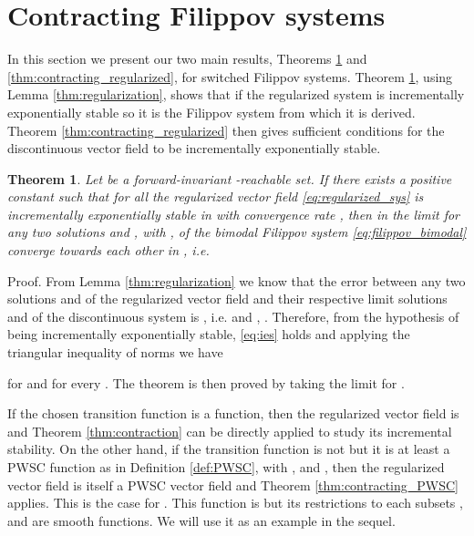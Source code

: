 \documentclass[twocolumn]{autart}
\newtheorem{theorem}{Theorem}
\begin{document}
\section{Contracting Filippov systems}
\label{sec:filippov}
In this section we present our two main results, Theorems \ref{thm:contraction_filippov} and \ref{thm:contracting_regularized}, for switched Filippov systems. Theorem \ref{thm:contraction_filippov}, using Lemma \ref{thm:regularization}, shows that if the regularized system  is incrementally exponentially stable so it is the Filippov system from which it is derived. 
Theorem \ref{thm:contracting_regularized} then gives sufficient conditions for the discontinuous vector field to be incrementally exponentially stable.
\begin{theorem}
\label{thm:contraction_filippov}
Let  be a forward-invariant -reachable set. If there exists a positive constant  such that for all  the regularized vector field  \eqref{eq:regularized_sys} is incrementally exponentially stable in  with convergence rate , then in the limit for  any two solutions  and , with , of the bimodal Filippov system \eqref{eq:filippov_bimodal} converge towards each other in , i.e.

\end{theorem}
\begin{pf*}{Proof.}
From Lemma \ref{thm:regularization} we know that the error between any two solutions  and  of the regularized vector field  and their respective limit solutions  and  of the discontinuous system is , i.e.  and , . Therefore, from the hypothesis of  being incrementally exponentially stable, \eqref{eq:ies} holds and applying the triangular inequality of norms we have

for  and for every . 
The theorem is then proved by taking the limit for .
\end{pf*}
If the chosen transition function  is a  function, then the regularized vector field  is  and Theorem \ref{thm:contraction} can be directly applied to study its incremental stability. On the other hand, if the transition function is not  but it is at least a PWSC function as in Definition \ref{def:PWSC}, with ,  and , then the regularized vector field  is itself a PWSC vector field and Theorem \ref{thm:contracting_PWSC} applies. This is the case for . This function is  but its restrictions to each subsets ,  and  are smooth functions. We will use it as an example in the sequel.
\end{document}
